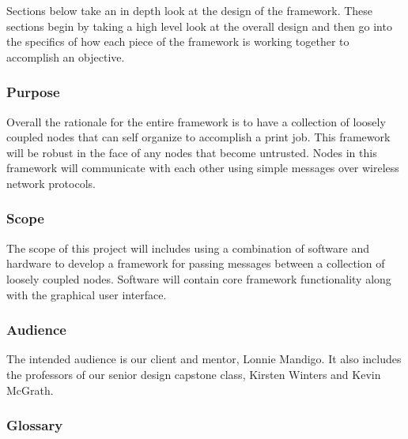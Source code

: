 \documentclass[draftclsnofoot, onecolumn, compsoc, 10pt]{IEEEtran}
\begin{document}
Sections below take an in depth look at the design of the framework. These sections begin by taking a high level look at the overall design and then go into the specifics of how each piece of the framework is working together to accomplish an objective.

\subsubsection{Purpose}
Overall the rationale for the entire framework is to have a collection of loosely coupled nodes that can self organize to accomplish a print job. This framework will be robust in the face of any nodes that become untrusted. Nodes in this framework will communicate with each other using simple messages over wireless network protocols. 

\subsubsection{Scope}
The scope of this project will includes using a combination of software and hardware to develop a framework for passing messages between a collection of loosely coupled nodes. Software will contain core framework functionality along with the graphical user interface. 

\subsubsection{Audience}
The intended audience is our client and mentor, Lonnie Mandigo. It also includes the professors of our senior design capstone class, Kirsten Winters and Kevin McGrath.

\subsubsection{Glossary}
\end{document}
